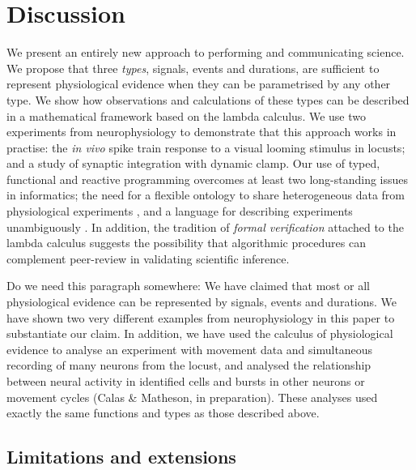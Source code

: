 \section*{Discussion}

We present an entirely new approach to performing and communicating
science. We propose that three \emph{types}, signals, events and
durations, are sufficient to represent physiological evidence when
they can be parametrised by any other type. We show how observations
and calculations of these types can be described in a mathematical
framework based on the lambda calculus. We use two experiments from
neurophysiology to demonstrate that this approach works in practise:
the \emph{in vivo} spike train response to a visual looming stimulus
in locusts; and a study of synaptic integration with dynamic
clamp. Our use of typed, functional and reactive programming overcomes
at least two long-standing issues in informatics; the need for a
flexible ontology to share heterogeneous data from physiological
experiments \citep{Amari2002}, and a language for describing
experiments unambiguously \citep{MurrayRust2002}. In addition, the
tradition of \emph{formal verification} attached to the lambda
calculus suggests the possibility that algorithmic procedures can
complement peer-review in validating scientific inference.

Do we need this paragraph somewhere: We have claimed that most or all
physiological evidence can be represented by signals, events and
durations. We have shown two very different examples from
neurophysiology in this paper to substantiate our claim. In addition,
we have used the calculus of physiological evidence to analyse an
experiment with movement data and simultaneous recording of many
neurons from the locust, and analysed the relationship between neural
activity in identified cells and bursts in other neurons or movement
cycles (Calas \& Matheson, in preparation). These analyses used
exactly the same functions and types as those described above.

\subsection*{Limitations and extensions}

